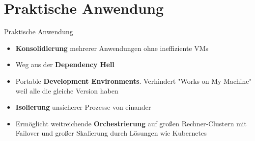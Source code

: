 \documentclass{beamer}
\begin{document}
  \section{Praktische Anwendung}
  \begin{frame}{Praktische Anwendung}
    \begin{itemize}[<+->]
      \item \textbf{Konsolidierung} mehrerer Anwendungen ohne ineffiziente VMs
      \item Weg aus der \textbf{Dependency Hell}
      \item Portable \textbf{Development Environments}. Verhindert "Works on My Machine" weil alle die gleiche Version haben
      \item \textbf{Isolierung} unsicherer Prozesse von einander
      \item Ermöglicht weitreichende \textbf{Orchestrierung} auf großen Rechner-Clustern mit Failover und großer Skalierung durch Lösungen wie Kubernetes
    \end{itemize}
  \end{frame}
   
\end{document}
